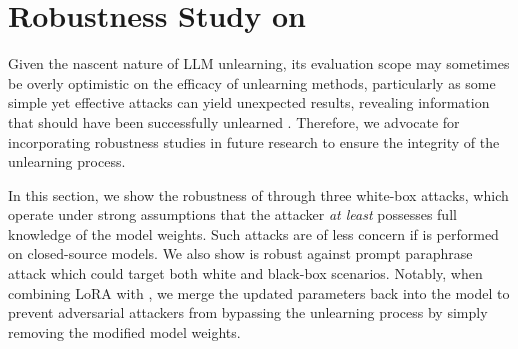 


\section{Robustness Study on \lunar} \label{sec:exp_attack}

Given the nascent nature of LLM unlearning, its evaluation scope may sometimes be overly optimistic on the efficacy of unlearning methods, particularly as some simple yet effective attacks can yield unexpected results, revealing information that should have been successfully unlearned \citep{thaker2024position, liu2024rethinking, zhang2024does}. Therefore, we advocate for incorporating robustness studies in future research to ensure the integrity of the unlearning process.

In this section, we show the robustness of \lunar through three white-box attacks, which operate under strong assumptions that the attacker \textit{at least} possesses full knowledge of the model weights. Such attacks are of less concern if \lunar is performed on closed-source models. We also show \lunar is robust against prompt paraphrase attack which could target both white and black-box scenarios. Notably, when combining LoRA with \lunar, we merge the updated parameters back into the model to prevent adversarial attackers from bypassing the unlearning process by simply removing the modified model weights.

